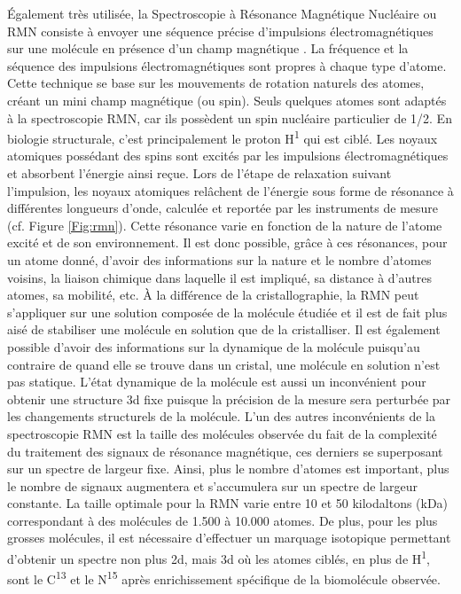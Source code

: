 Également très utilisée, la Spectroscopie à Résonance Magnétique Nucléaire ou RMN consiste à envoyer une séquence précise d'impulsions électromagnétiques sur une molécule en présence d'un champ magnétique \cite{wuthrich1986nmr}. La fréquence et la séquence des impulsions électromagnétiques sont propres à chaque type d'atome. Cette technique se base sur les mouvements de rotation naturels des atomes, créant un mini champ magnétique (ou spin). Seuls quelques atomes sont adaptés à la spectroscopie RMN, car ils possèdent un spin nucléaire particulier de 1/2. En biologie structurale, c'est principalement le proton H\textsuperscript{1} qui est ciblé. Les noyaux atomiques possédant des spins sont excités par les impulsions électromagnétiques et absorbent l'énergie ainsi reçue. Lors de l'étape de relaxation suivant l'impulsion, les noyaux atomiques relâchent de l'énergie sous forme de résonance à différentes longueurs d'onde, calculée et reportée par les instruments de mesure (cf. Figure \ref{Fig:rmn}). Cette résonance varie en fonction de la nature de l'atome excité et de son environnement. Il est donc possible, grâce à ces résonances, pour un atome donné, d'avoir des informations sur la nature et le nombre d'atomes voisins, la liaison chimique dans laquelle il est impliqué, sa distance à d'autres atomes, sa mobilité, etc. À la différence de la cristallographie, la RMN peut s'appliquer sur une solution composée de la molécule étudiée et il est de fait plus aisé de stabiliser une molécule en solution que de la cristalliser. Il est également possible d'avoir des informations sur la dynamique de la molécule puisqu'au contraire de quand elle se trouve dans un cristal, une molécule en solution n'est pas statique.
L'état dynamique de la molécule est aussi un inconvénient pour obtenir une structure 3d fixe puisque la précision de la mesure sera perturbée par les changements structurels de la molécule. L'un des autres inconvénients de la spectroscopie RMN est la taille des molécules observée du fait de la complexité du traitement des signaux de résonance magnétique, ces derniers se superposant sur un spectre de largeur fixe. Ainsi, plus le nombre d'atomes est important, plus le nombre de signaux augmentera et s'accumulera sur un spectre de largeur constante. La taille optimale pour la RMN varie entre 10 et 50 kilodaltons (kDa) correspondant à des molécules de 1.500 à 10.000 atomes. De plus, pour les plus grosses molécules, il est nécessaire d'effectuer un marquage isotopique permettant d'obtenir un spectre non plus 2d, mais 3d où les atomes ciblés, en plus de H\textsuperscript{1}, sont le C\textsuperscript{13} et le N\textsuperscript{15} après enrichissement spécifique de la biomolécule observée.

